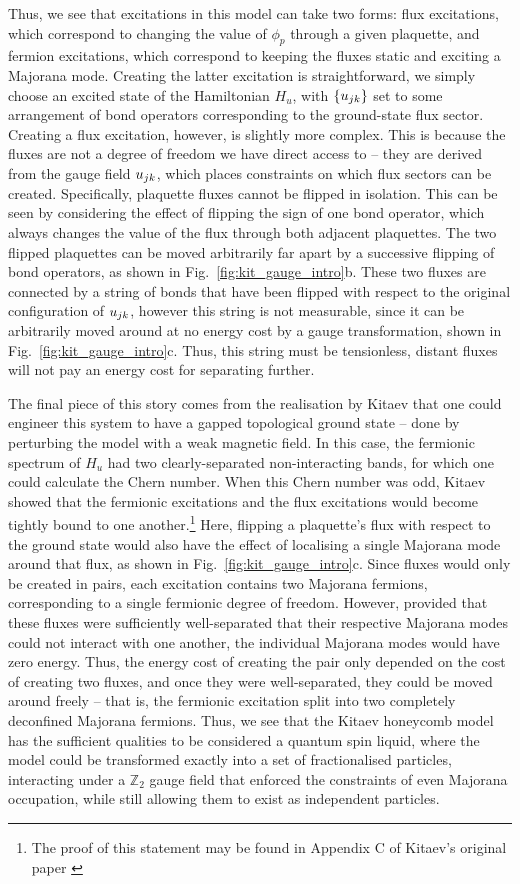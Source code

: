 Thus, we see that excitations in this model can take two forms: flux excitations, which correspond to changing the value of $\phi_p$ through a given plaquette, and fermion excitations, which correspond to keeping the fluxes static and exciting a Majorana mode. Creating the latter excitation is straightforward, we simply choose an excited state of the Hamiltonian $H_u$, with $\{u_{jk}\}$ set to some arrangement of bond operators corresponding to the ground-state flux sector. Creating a flux excitation, however, is slightly more complex. This is because the fluxes are not a degree of freedom we have direct access to -- they are derived from the gauge field $u_{jk}$, which places constraints on which flux sectors can be created. Specifically, plaquette fluxes cannot be flipped in isolation. This can be seen by considering the effect of flipping the sign of one bond operator, which always changes the value of the flux through both adjacent plaquettes. The two flipped plaquettes can be moved arbitrarily far apart by a successive flipping of bond operators, as shown in Fig.~\ref{fig:kit_gauge_intro}b. These two fluxes are connected by a string of bonds that have been flipped with respect to the original configuration of $u_{jk}$, however this string is not measurable, since it can be arbitrarily moved around at no energy cost by a gauge transformation, shown in Fig.~\ref{fig:kit_gauge_intro}c. Thus, this string must be tensionless, distant fluxes will not pay an energy cost for separating further. 

The final piece of this story comes from the realisation by Kitaev that one could engineer this system to have a gapped topological ground state -- done by perturbing the model with a weak magnetic field. In this case, the fermionic spectrum of $H_u$ had two clearly-separated non-interacting bands, for which one could calculate the Chern number. When this Chern number was odd, Kitaev showed that the fermionic excitations and the flux excitations would become tightly bound to one another.\footnote{The proof of this statement may be found in Appendix C of Kitaev's original paper \cite{kitaev_anyons_2006}} Here, flipping a plaquette's flux with respect to the ground state would also have the effect of localising a single Majorana mode around that flux, as shown in Fig.~\ref{fig:kit_gauge_intro}c. Since fluxes would only be created in pairs, each excitation contains two Majorana fermions, corresponding to a single fermionic degree of freedom.  However, provided that these fluxes were sufficiently well-separated that their respective Majorana modes could not interact with one another, the individual Majorana modes would have zero energy. Thus, the energy cost of creating the pair only depended on the cost of creating two fluxes, and once they were well-separated, they could be moved around freely -- that is, the fermionic excitation split into two completely deconfined Majorana fermions. Thus, we see that the Kitaev honeycomb model has the sufficient qualities to be considered a quantum spin liquid, where the model could be transformed exactly into a set of fractionalised particles, interacting under a $\mathbb Z_2$ gauge field that enforced the constraints of even Majorana occupation, while still allowing them to exist as independent particles.

